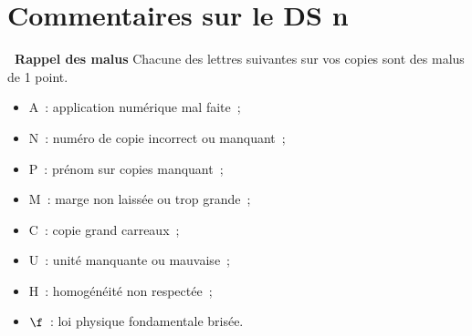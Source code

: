 \documentclass[a4paper, 10pt, final, garamond]{book}
\begin{document}
\setcounter{chapter}{2}

\chapter{Commentaires sur le DS n}

\begin{NCprop}[width=\linewidth]{\centering\bfseries\ Rappel des malus}
    Chacune des lettres suivantes sur vos copies sont des malus de \num{1}
    point.\smallbreak
    \begin{minipage}{0.50\linewidth}
        \begin{itemize}
            \item A~: application numérique mal faite~;
            \item N~: numéro de copie incorrect ou manquant~;
            \item P~: prénom sur copies manquant~;
            \item M~: marge non laissée ou trop grande~;
        \end{itemize}
    \end{minipage}
    \begin{minipage}{0.50\linewidth}
        \begin{itemize}
            \item C~: copie grand carreaux~;
            \item U~: unité manquante ou mauvaise~;
            \item H~: homogénéité non respectée~;
            \item $\f$~: loi physique fondamentale brisée.
        \end{itemize}
    \end{minipage}
\end{NCprop}
\end{document}
